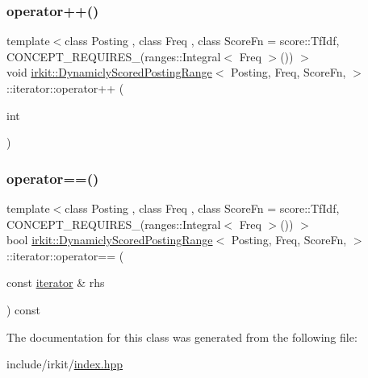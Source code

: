 \mbox{\label{classirkit_1_1DynamiclyScoredPostingRange_1_1iterator_a0e72e53fba01c4ef07f4ee4495fb786b}} 
\subsubsection{\texorpdfstring{operator++()}{operator++()}\hspace{0.1cm}{\footnotesize\ttfamily [2/2]}}
{\footnotesize\ttfamily template$<$class Posting , class Freq , class Score\+Fn  = score\+::\+Tf\+Idf, C\+O\+N\+C\+E\+P\+T\+\_\+\+R\+E\+Q\+U\+I\+R\+E\+S\+\_\+(ranges\+::\+Integral$<$ Freq $>$()) $>$ \\
void \mbox{\hyperlink{classirkit_1_1DynamiclyScoredPostingRange}{irkit\+::\+Dynamicly\+Scored\+Posting\+Range}}$<$ Posting, Freq, Score\+Fn, $>$\+::iterator\+::operator++ (\begin{DoxyParamCaption}\item[{int}]{ }\end{DoxyParamCaption})\hspace{0.3cm}{\ttfamily [inline]}}

\mbox{\label{classirkit_1_1DynamiclyScoredPostingRange_1_1iterator_ac097b4d56a87359fe0f726042d639cc9}} 
\subsubsection{\texorpdfstring{operator==()}{operator==()}}
{\footnotesize\ttfamily template$<$class Posting , class Freq , class Score\+Fn  = score\+::\+Tf\+Idf, C\+O\+N\+C\+E\+P\+T\+\_\+\+R\+E\+Q\+U\+I\+R\+E\+S\+\_\+(ranges\+::\+Integral$<$ Freq $>$()) $>$ \\
bool \mbox{\hyperlink{classirkit_1_1DynamiclyScoredPostingRange}{irkit\+::\+Dynamicly\+Scored\+Posting\+Range}}$<$ Posting, Freq, Score\+Fn, $>$\+::iterator\+::operator== (\begin{DoxyParamCaption}\item[{const \mbox{\hyperlink{classirkit_1_1DynamiclyScoredPostingRange_1_1iterator}{iterator}} \&}]{rhs }\end{DoxyParamCaption}) const\hspace{0.3cm}{\ttfamily [inline]}}



The documentation for this class was generated from the following file\+:\begin{DoxyCompactItemize}
\item 
include/irkit/\mbox{\hyperlink{irkit_2index_8hpp}{index.\+hpp}}\end{DoxyCompactItemize}
